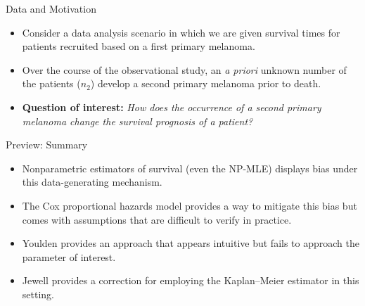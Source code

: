 \documentclass[12pt,t]{beamer}
\begin{document}
\begin{frame}[c]{Data and Motivation}

\begin{center}
\begin{itemize}
  \itemsep12pt
  \item Consider a data analysis scenario in which we are given survival times
    for patients recruited based on a first primary melanoma.
  \item Over the course of the observational study, an \textit{a priori} unknown
    number of the patients ($n_2$) develop a second primary melanoma prior to
    death.
  \item \textbf{Question of interest:} \textit{How does the occurrence of a
    second primary melanoma change the survival prognosis of a patient?}
\end{itemize}
\end{center}

\note{
}

\end{frame}


\begin{frame}[c]{Preview: Summary}

\begin{center}
\begin{itemize}
  \itemsep12pt
  \item Nonparametric estimators of survival (even the NP-MLE) displays bias
    under this data-generating mechanism.
  \item The Cox proportional hazards model provides a way to mitigate this bias
    but comes with assumptions that are difficult to verify in practice.
  \item Youlden provides an approach that appears intuitive but fails to
    approach the parameter of interest.
  \item Jewell provides a correction for employing the Kaplan--Meier estimator
    in this setting.
\end{itemize}
\end{center}


\end{frame}

\end{document}
